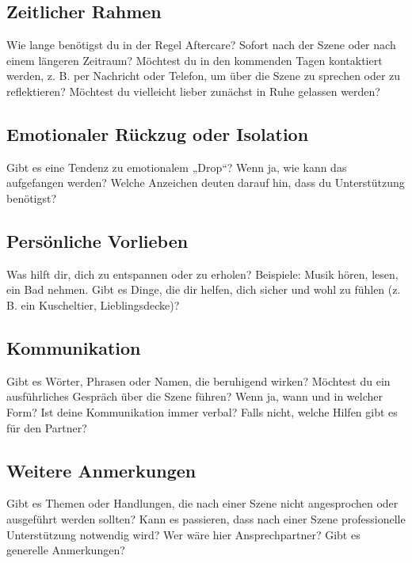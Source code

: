 \documentclass[a4paper,12pt]{article}
\begin{document}
\subsection{Zeitlicher Rahmen}
\noindent Wie lange benötigst du in der Regel Aftercare? Sofort nach der Szene oder nach einem längeren Zeitraum? Möchtest du in den kommenden Tagen kontaktiert werden, z. B. per Nachricht oder Telefon, um über die Szene zu sprechen oder zu reflektieren? Möchtest du vielleicht lieber zunächst in Ruhe gelassen werden? \newline
\noindent \TextField[name=AftercareZeitlich,multiline=true,height=7em, width=37em]{}

\subsection{Emotionaler Rückzug oder Isolation}
\noindent Gibt es eine Tendenz zu emotionalem „Drop“? Wenn ja, wie kann das aufgefangen werden? Welche Anzeichen deuten darauf hin, dass du Unterstützung benötigst? \newline
\noindent \TextField[name=AftercareDrop,multiline=true,height=7em, width=37em]{}

\subsection{Persönliche Vorlieben}
\noindent Was hilft dir, dich zu entspannen oder zu erholen? Beispiele: Musik hören, lesen, ein Bad nehmen. Gibt es Dinge, die dir helfen, dich sicher und wohl zu fühlen (z. B. ein Kuscheltier, Lieblingsdecke)? \newline
\noindent \TextField[name=AftercarePreference,multiline=true,height=7em, width=37em]{}

\subsection{Kommunikation}
\noindent Gibt es Wörter, Phrasen oder Namen, die beruhigend wirken? Möchtest du ein ausführliches Gespräch über die Szene führen? Wenn ja, wann und in welcher Form? Ist deine Kommunikation immer verbal? Falls nicht, welche Hilfen gibt es für den Partner?\newline
\noindent \TextField[name=AftercareKommunikation,multiline=true,height=7em, width=37em]{}

\subsection{Weitere Anmerkungen}
\noindent Gibt es Themen oder Handlungen, die nach einer Szene nicht angesprochen oder ausgeführt werden sollten? Kann es passieren, dass nach einer Szene professionelle Unterstützung notwendig wird? Wer wäre hier Ansprechpartner? Gibt es generelle Anmerkungen?\newline
\noindent \TextField[name=AftercareBesonders,multiline=true,height=17em, width=37em]{}
\end{document}
